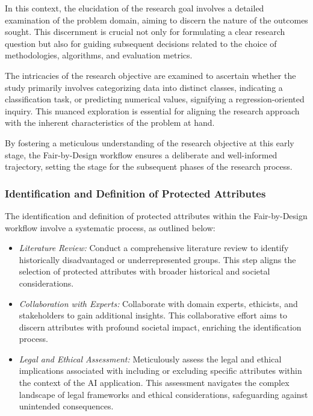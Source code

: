 In this context, the elucidation of the research goal involves a detailed examination of the problem domain, aiming to discern the nature of the outcomes sought. This discernment is crucial not only for formulating a clear research question but also for guiding subsequent decisions related to the choice of methodologies, algorithms, and evaluation metrics.

The intricacies of the research objective are examined to ascertain whether the study primarily involves categorizing data into distinct classes, indicating a classification task, or predicting numerical values, signifying a regression-oriented inquiry. This nuanced exploration is essential for aligning the research approach with the inherent characteristics of the problem at hand.

By fostering a meticulous understanding of the research objective at this early stage, the Fair-by-Design workflow ensures a deliberate and well-informed trajectory, setting the stage for the subsequent phases of the research process.

\subsubsection{Identification and Definition of Protected Attributes}

The identification and definition of protected attributes within the Fair-by-Design workflow involve a systematic process, as outlined below:

\begin{itemize}
    \item \emph{Literature Review:} Conduct a comprehensive literature review to identify historically disadvantaged or underrepresented groups. This step aligns the selection of protected attributes with broader historical and societal considerations.
    
    \item \emph{Collaboration with Experts:} Collaborate with domain experts, ethicists, and stakeholders to gain additional insights. This collaborative effort aims to discern attributes with profound societal impact, enriching the identification process.
    
    \item \emph{Legal and Ethical Assessment:} Meticulously assess the legal and ethical implications associated with including or excluding specific attributes within the context of the AI application. This assessment navigates the complex landscape of legal frameworks and ethical considerations, safeguarding against unintended consequences.
\end{itemize}

